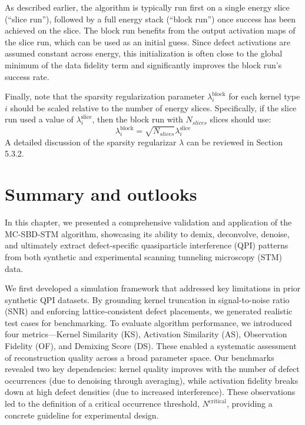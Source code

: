As described earlier, the algorithm is typically run first on a single energy slice (“slice run”), followed by a full energy stack (“block run”) once success has been achieved on the slice. The block run benefits from the output activation maps of the slice run, which can be used as an initial guess. Since defect activations are assumed constant across energy, this initialization is often close to the global minimum of the data fidelity term and significantly improves the block run’s success rate.

Finally, note that the sparsity regularization parameter $\lambda_i^{\text{block}}$ for each kernel type $i$ should be scaled relative to the number of energy slices. Specifically, if the slice run used a value of $\lambda_i^{\text{slice}}$, then the block run with $N_{slices}$ slices should use:
\begin{equation}
	\lambda_i^{\text{block}} = \sqrt{N_{slices}}\lambda_i^{\text{slice}}
\end{equation}
A detailed discussion of the sparsity regularizar $\lambda$ can be reviewed in Section 5.3.2. 

\section{Summary and outlooks}
In this chapter, we presented a comprehensive validation and application of the MC-SBD-STM algorithm, showcasing its ability to demix, deconvolve, denoise, and ultimately extract defect-specific quasiparticle interference (QPI) patterns from both synthetic and experimental scanning tunneling microscopy (STM) data.

We first developed a simulation framework that addressed key limitations in prior synthetic QPI datasets. By grounding kernel truncation in signal-to-noise ratio (SNR) and enforcing lattice-consistent defect placements, we generated realistic test cases for benchmarking. To evaluate algorithm performance, we introduced four metrics—Kernel Similarity (KS), Activation Similarity (AS), Observation Fidelity (OF), and Demixing Score (DS). These enabled a systematic assessment of reconstruction quality across a broad parameter space. Our benchmarks revealed two key dependencies: kernel quality improves with the number of defect occurrences (due to denoising through averaging), while activation fidelity breaks down at high defect densities (due to increased interference). These observations led to the definition of a critical occurrence threshold, $N^{\text{critical}}$, providing a concrete guideline for experimental design. 

